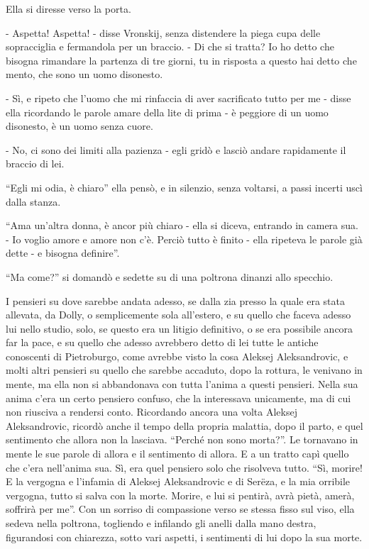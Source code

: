 Ella si diresse verso la porta. 

- Aspetta! Aspetta! - disse Vronskij, senza distendere la piega cupa delle sopracciglia e fermandola per un braccio. - Di che si tratta? Io ho detto che bisogna rimandare la partenza di tre giorni, tu in risposta a questo hai detto che mento, che sono un uomo disonesto. 

- Sì, e ripeto che l'uomo che mi rinfaccia di aver sacrificato tutto per me - disse ella ricordando le parole amare della lite di prima - è peggiore di un uomo disonesto, è un uomo senza cuore. 

- No, ci sono dei limiti alla pazienza - egli gridò e lasciò andare rapidamente il braccio di lei. 

``Egli mi odia, è chiaro'' ella pensò, e in silenzio, senza voltarsi, a passi incerti uscì dalla stanza. 

``Ama un'altra donna, è ancor più chiaro - ella si diceva, entrando in camera sua. - Io voglio amore e amore non c'è. Perciò tutto è finito - ella ripeteva le parole già dette - e bisogna definire''. 

``Ma come?'' si domandò e sedette su di una poltrona dinanzi allo specchio. 

I pensieri su dove sarebbe andata adesso, se dalla zia presso la quale era stata allevata, da Dolly, o semplicemente sola all'estero, e su quello che faceva adesso lui nello studio, solo, se questo era un litigio definitivo, o se era possibile ancora far la pace, e su quello che adesso avrebbero detto di lei tutte le antiche conoscenti di Pietroburgo, come avrebbe visto la cosa Aleksej Aleksandrovic, e molti altri pensieri su quello che sarebbe accaduto, dopo la rottura, le venivano in mente, ma ella non si abbandonava con tutta l'anima a questi pensieri. Nella sua anima c'era un certo pensiero confuso, che la interessava unicamente, ma di cui non riusciva a rendersi conto. Ricordando ancora una volta Aleksej Aleksandrovic, ricordò anche il tempo della propria malattia, dopo il parto, e quel sentimento che allora non la lasciava. ``Perché non sono morta?''. Le tornavano in mente le sue parole di allora e il sentimento di allora. E a un tratto capì quello che c'era nell'anima sua. Sì, era quel pensiero solo che risolveva tutto. ``Sì, morire! E la vergogna e l'infamia di Aleksej Aleksandrovic e di Serëza, e la mia orribile vergogna, tutto si salva con la morte. Morire, e lui si pentirà, avrà pietà, amerà, soffrirà per me''. Con un sorriso di compassione verso se stessa fisso sul viso, ella sedeva nella poltrona, togliendo e infilando gli anelli dalla mano destra, figurandosi con chiarezza, sotto vari aspetti, i sentimenti di lui dopo la sua morte. 

